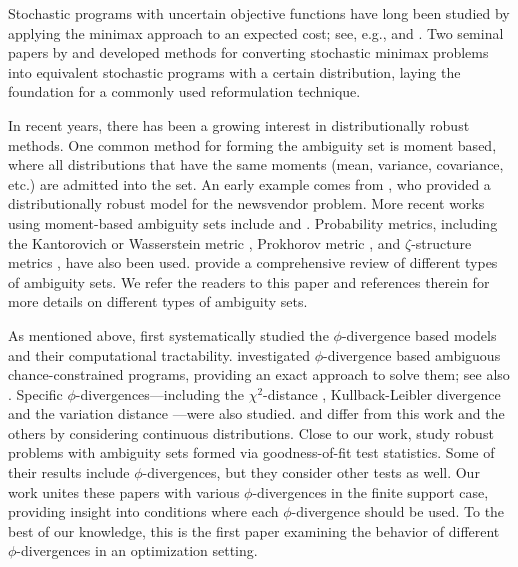 \documentclass[opre,nonblindrev]{informs3} %
\begin{document}
Stochastic programs with uncertain objective functions have long been studied by applying the minimax approach to an expected cost; see, e.g., \cite{zackova1966minimax} and \cite{dupacova_87}.
Two seminal papers by \cite{shapiro2002minimax} and \cite{shapiro2004class} developed methods for converting stochastic minimax problems into equivalent stochastic programs with a certain distribution, laying the foundation for a commonly used reformulation technique.

In recent years, there has been a growing interest in distributionally robust methods.
One common method for forming the ambiguity set is moment based, where all distributions that have the same moments (mean, variance, covariance, etc.) are admitted into the set.
An early example comes from \citet{scarf1958min}, who provided a distributionally robust model for the newsvendor problem.
More recent works using moment-based ambiguity sets include \cite{delage2010distributionally} and \cite{wiesemann2013distributionally}. 
Probability metrics, including the Kantorovich or Wasserstein metric \citep{pflug2007ambiguity,eskuhn_15}, Prokhorov metric \citep{erdogan2006ambiguous}, and $\zeta$-structure metrics \citep{zhao2015}, have also been used. %
\cite{hanasusanto_etal_15} provide a comprehensive review of different types of ambiguity sets. 
We refer the readers to this paper and references therein for more details on different types of ambiguity sets. 

As mentioned above, \cite{bental2013robust} first systematically studied the $\phi$-divergence based models and their computational tractability. 
\cite{jiang2012data} investigated $\phi$-divergence based ambiguous chance-constrained programs, providing an exact approach to solve them; see also \cite{yanikoglu2012}. 
Specific $\phi$-divergences---including the $\chi^2$-distance \citep{klabjan2013robust}, Kullback-Leibler divergence \citep{calafiore2007ambiguous,hukullback,wang2010likelihood} and the variation distance \citep{jiang2015variation}---were also studied. 
\citet{hukullback} and \citet{jiang2015variation} differ from this work and the others by considering continuous distributions.
Close to our work, \cite{bertsimas_gupta_kallus_14} study robust problems with ambiguity sets formed via goodness-of-fit test statistics. Some of their results include $\phi$-divergences, but they consider other tests as well. 
Our work unites these papers with various $\phi$-divergences in the finite support case, providing insight into conditions where each $\phi$-divergence should be used. 
To the best of our knowledge, this is the first paper examining the behavior of different $\phi$-divergences in an optimization setting. 
\end{document}
